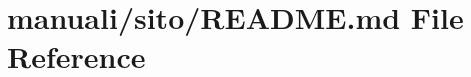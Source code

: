 \hypertarget{manuali_2sito_2README_8md}{}\section{manuali/sito/\+R\+E\+A\+D\+ME.md File Reference}
\label{manuali_2sito_2README_8md}
